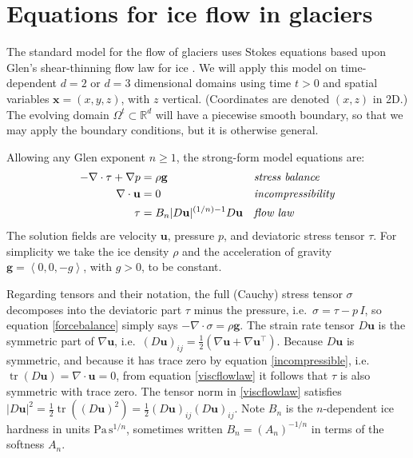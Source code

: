 \documentclass[letterpaper,final,12pt,reqno]{amsart}
\newcommand{\RR}{\mathbb{R}}
\newcommand{\grad}{\nabla}
\newcommand{\Div}{\nabla\cdot}
\newcommand{\trace}{\operatorname{tr}}
\newcommand{\bg}{\mathbf{g}}
\newcommand{\bu}{\mathbf{u}}
\newcommand{\bx}{\mathbf{x}}
\begin{document}
\section{Equations for ice flow in glaciers} \label{sec:strongform}

The standard model for the flow of glaciers uses Stokes equations based upon Glen's shear-thinning flow law for ice \cite{GreveBlatter2009,JouvetRappaz2011,SchoofHewitt2013}.  We will apply this model on time-dependent $d=2$ or $d=3$ dimensional domains using time $t>0$ and spatial variables $\bx=(x,y,z)$, with $z$ vertical.  (Coordinates are denoted $(x,z)$ in 2D.)  The evolving domain $\Omega^t \subset \RR^d$ will have a piecewise smooth boundary, so that we may apply the boundary conditions, but it is otherwise general.

Allowing any Glen exponent $n\ge 1$, the strong-form model equations are:
\begin{align}
- \nabla \cdot \tau + \nabla p &= \rho \bg &&\text{\emph{stress balance}} \label{forcebalance} \\
\nabla \cdot \bu &= 0 &&\text{\emph{incompressibility}} \label{incompressible} \\
\tau &= B_n |D\bu|^{(1/n) - 1} D\bu  &&\text{\emph{flow law}} \label{viscflowlaw}
\end{align}
The solution fields are velocity $\bu$, pressure $p$, and deviatoric stress tensor $\tau$.  For simplicity we take the ice density $\rho$ and the acceleration of gravity $\bg=\left<0,0,-g\right>$, with $g>0$, to be constant.

Regarding tensors and their notation, the full (Cauchy) stress tensor $\sigma$ decomposes into the deviatoric part $\tau$ minus the pressure, i.e.~$\sigma = \tau - p\,I$, so equation \eqref{forcebalance} simply says $-\Div \sigma = \rho \bg$.  The strain rate tensor $D\bu$ is the symmetric part of $\grad \bu$, i.e.~$(D\bu)_{ij} = \frac{1}{2} \left(\grad\bu + \grad\bu^\top\right)$.  Because $D\bu$ is symmetric, and because it has trace zero by equation \eqref{incompressible}, i.e.~$\trace(D\bu)=\nabla \cdot \bu = 0$, from equation \eqref{viscflowlaw} it follows that $\tau$ is also symmetric with trace zero.  The tensor norm in \eqref{viscflowlaw} satisfies $|D\bu|^2 = \frac{1}{2} \trace\left((D\bu)^2\right) = \frac{1}{2} (D\bu)_{ij} (D\bu)_{ij}$.  Note $B_n$ is the $n$-dependent ice hardness in units $\text{Pa}\,\text{s}^{1/n}$, sometimes written $B_n = (A_n)^{-1/n}$ in terms of the softness $A_n$.
\end{document}

